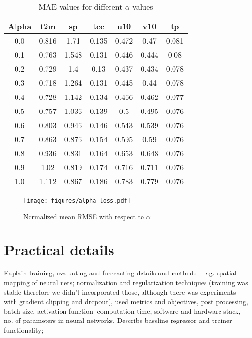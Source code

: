 \begin{table}[htbp]
    \centering
    \begin{tabular}{ccccccc}
        \toprule
        Alpha & t2m & sp & tcc & u10 & v10 & tp \\
        \midrule
        0.0 & 0.816 & 1.71 & 0.135 & 0.472 & 0.47 & 0.081 \\
        0.1 & 0.763 & 1.548 & 0.131 & 0.446 & 0.444 & 0.08 \\
        0.2 & 0.729 & 1.4 & 0.13 & 0.437 & 0.434 & 0.078 \\
        0.3 & 0.718 & 1.264 & 0.131 & 0.445 & 0.44 & 0.078 \\
        0.4 & 0.728 & 1.142 & 0.134 & 0.466 & 0.462 & 0.077 \\
        0.5 & 0.757 & 1.036 & 0.139 & 0.5 & 0.495 & 0.076 \\
        0.6 & 0.803 & 0.946 & 0.146 & 0.543 & 0.539 & 0.076 \\
        0.7 & 0.863 & 0.876 & 0.154 & 0.595 & 0.59 & 0.076 \\
        0.8 & 0.936 & 0.831 & 0.164 & 0.653 & 0.648 & 0.076 \\
        0.9 & 1.02 & 0.819 & 0.174 & 0.716 & 0.711 & 0.076 \\
        1.0 & 1.112 & 0.867 & 0.186 & 0.783 & 0.779 & 0.076 \\
        \bottomrule
    \end{tabular}
    \caption{MAE values for different $\alpha$ values}
    \label{tab:mae_alpha}
\end{table}

\begin{figure}[!ht]
    \centering
    \texttt{[image: figures/alpha\_loss.pdf]}
    \caption{Normalized mean RMSE with respect to $\alpha$}
    \label{fig:alpha-plot}
\end{figure}

\section{Practical details}
Explain training, evaluating and forecasting details and methods -- e.g. spatial mapping of neural nets; normalization and regularization techniques (training was stable therefore we didn't incorporated those, although there was experiments with gradient clipping and dropout), used metrics and objectives, post processing, batch size, activation function, computation time, software and hardware stack, no. of parameters in neural networks. Describe baseline regressor and trainer functionality; 

